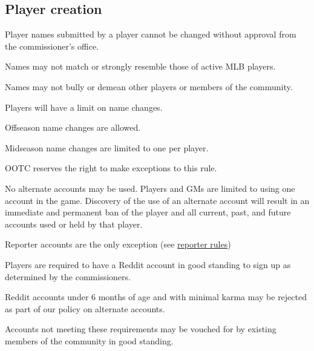 \subsection{Player creation}
\begin{deepEnumerate}
	\item Player names submitted by a player cannot be changed without approval from the commissioner's office.
	\begin{deepEnumerate}
		\item Names may not match or strongly resemble those of active MLB players.
		\item Names may not bully or demean other players or members of the community.
		\item Players will have a limit on name changes.
		\begin{deepEnumerate}
			\item Offseason name changes are allowed.
			\item Midseason name changes are limited to one per player.
			\item OOTC reserves the right to make exceptions to this rule.
		\end{deepEnumerate}
		\item No alternate accounts may be used. Players and GMs are limited to using one account in the game.
		Discovery of the use of an alternate account will result in an immediate and permanent ban of the player
		and all current, past, and future accounts used or held by that player.
		\begin{deepEnumerate}
			\item Reporter accounts are the only exception (see \hyperref[sec:reporters]{reporter rules})
		\end{deepEnumerate}
	\end{deepEnumerate}
	\item Players are required to have a Reddit account in good standing to sign up as determined by the commissioners.
	\begin{deepEnumerate}
		\item Reddit accounts under 6 months of age and with minimal karma may be rejected as part of our policy on alternate accounts.
		\begin{deepEnumerate}
			\item Accounts not meeting these requirements may be vouched for by existing members of the community in good standing.
		\end{deepEnumerate}
	\end{deepEnumerate}

\end{deepEnumerate}
